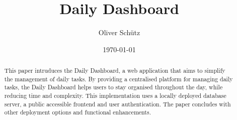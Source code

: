 

\titlehead{BSc Computational and Data Science\\Course: Computer Science (cds-205)\\Instructor: Ana Petrus\hfill}
\title{Daily Dashboard}
\author[1,*]{Oliver Schütz}
\date{\today}
\maketitle

\begin{abstract}
    This paper intruduces the Daily Dashboard, a web application that aims to simplify the management of daily tasks.
    By providing a centralised platform for managing daily tasks, the Daily Dashboard helps users to stay organised throughout the day, while reducing time and complexity.
    This implementation uses a locally deployed database server, a public accessible frontend and user authentication.
    The paper concludes with other deployment options and functional enhancements.
\end{abstract}
